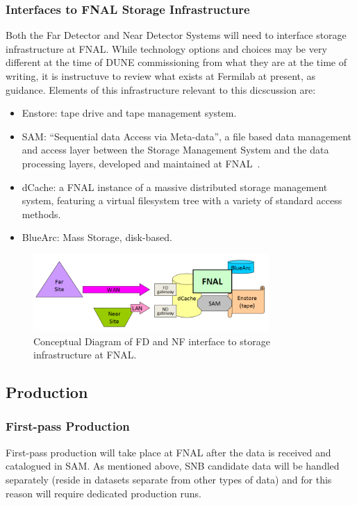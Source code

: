 \subsubsection{Interfaces to FNAL Storage Infrastructure}
Both the Far Detector and Near Detector Systems will need to interface storage infrastructure at FNAL.
While technology options and choices may be very different at the time of DUNE commissioning from what they
are at the time of writing, it is instructuve to review what exists at Fermilab at present, as guidance.
Elements of this infrastructure relevant to this dicscussion are:
\begin{itemize}
\item Enstore: tape drive and tape management system.

\item SAM: ``Sequential data Access via Meta-data'', a file based data management and access layer between the Storage Management System
and the data processing layers, developed and maintained at FNAL~\cite{sam_chep12}.

\item dCache: a FNAL instance of a massive distributed storage management system, featuring a virtual filesystem tree with a variety of standard access methods.

\item BlueArc: Mass Storage, disk-based.

\end{itemize}

\begin{figure}[h!]
\centering
\includegraphics[width=0.8\textwidth]{fnal-data-infrastructure-sketch-1.png}
\caption{Conceptual Diagram of FD and NF interface to storage infrastructure at FNAL.}
\label{fig:fnal-data-infrastructure}
\end{figure}

\subsection{Production}
\subsubsection{First-pass Production}
First-pass
production will take place at FNAL after the data is received and catalogued in SAM.
As mentioned above, SNB candidate data will be handled separately (reside in datasets separate from
other types of data) and for this reason will require dedicated production runs.


